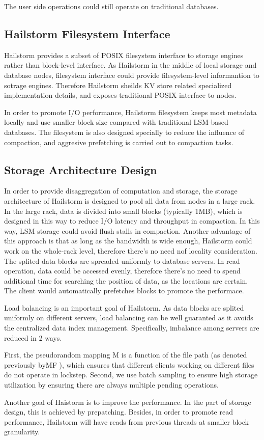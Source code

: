 \documentclass[a4paper,10pt,twoside]{article}
\begin{document}
The user side operations could still operate on traditional databases. 

\subsection{Hailstorm Filesystem Interface}
\par
Hailstorm provides a subset of POSIX filesystem interface to storage engines rather than block-level interface.
As Hailstorm in the middle of local storage and database nodes, filesystem interface could provide filesystem-level informantion to sotrage engines.
Therefore Hailstorm sheilds KV store related specialized implementation details, and exposes traditional POSIX interface to nodes.
\par
In order to promote I/O performance, Hailstorm filesystem keeps most metadata locally and use smaller block size compared with traditional LSM-based databases.
The filesystem is also designed specially to reduce the influence of compaction, and aggresive prefetching is carried out to compaction tasks.

\subsection{Storage Architecture Design}
\par
In order to provide disaggregation of computation and storage, the storage architecture of Hailstorm is designed to pool all data from nodes in a large rack.
In the large rack, data is divided into small blocks (typically 1MB), which is designed in this way to reduce I/O latency and throughput in compaction.
In this way, LSM storage could avoid flush stalls in compaction. 
Another advantage of this approach is that as long as the bandwidth is wide enough, Hailstorm could work on the whole-rack level, 
therefore there's no need nof locality consideration.
The splited data blocks are spreaded uniformly to database servers. 
In read operation, data could be accessed evenly, therefore there's no need to spend additional time for searching the position of data, as the locations are certain.
The client would automatically prefetches blocks to promote the performace.
\par
Load balancing is an important goal of Hailstorm. 
As data blocks are splited uniformly on different servers, load balancing can be well guaranted as it avoids the centralized data index management.
Specifically, imbalance among servers are reduced in 2 ways.
\begin{displayquote}
	First, the pseudorandom
	mapping M is a function of the file path (as denoted
	previously byMF ), which ensures that different clients working
	on different files do not operate in lockstep. Second, we
	use batch sampling to ensure high storage utilization by ensuring
	there are always multiple pending operations.
\end{displayquote}
Another goal of Haistorm is to improve the performance.
In the part of storage design, this is achieved by prepatching. 
Besides, in order to promote read performance, Hailstorm will have reads from previous threads at smaller block granularity.
\end{document}
